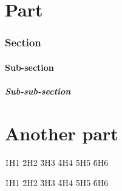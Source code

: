 \toc

\part{Part}

\section{Section}

\subsection{Sub-section}

\subsubsection{Sub-sub-section}

\part{Another part}

\h1{H1}
\h2{H2}
\h3{H3}
\h4{H4}
\h5{H5}
\h6{H6}

\appendix

\h1{H1}
\h2{H2}
\h3{H3}
\h4{H4}
\h5{H5}
\h6{H6}

